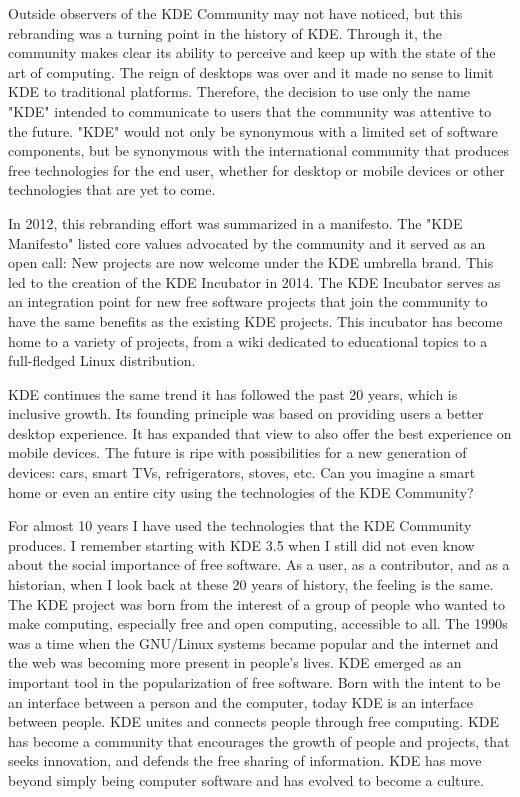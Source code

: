 Outside observers of the KDE Community may not have noticed, but this rebranding was a turning point in the history of KDE. Through it, the community makes clear its ability to perceive and keep up with the state of the art of computing. The reign of desktops was over and it made no sense to limit KDE to traditional platforms. Therefore, the decision to use only the name "KDE" intended to communicate to users that the community was attentive to the future. "KDE" would not only be synonymous with a limited set of software components, but be synonymous with the international community that produces free technologies for the end user, whether for desktop or mobile devices or other technologies that are yet to come. 

In 2012, this rebranding effort was summarized in a manifesto. The "KDE Manifesto" listed core values advocated by the community and it served as an open call: New projects are now welcome under the KDE umbrella brand. This led to the creation of the KDE Incubator in 2014. The KDE Incubator serves as an integration point for new free software projects that join the community to have the same benefits as the existing KDE projects. This incubator has become home to a variety of projects, from a wiki dedicated to educational topics to a full-fledged Linux distribution. 

KDE continues the same trend it has followed the past 20 years, which is inclusive growth. Its founding principle was based on providing users a better desktop experience. It has expanded that view to also offer the best experience on mobile devices. The future is ripe with possibilities for a new generation of devices: cars, smart TVs, refrigerators, stoves, etc. Can you imagine a smart home or even an entire city using the technologies of the KDE Community? 

For almost 10 years I have used the technologies that the KDE Community produces. I remember starting with KDE 3.5 when I still did not even know about the social importance of free software. As a user, as a contributor, and as a historian, when I look back at these 20 years of history, the feeling is the same. The KDE project was born from the interest of a group of people who wanted to make computing, especially free and open computing, accessible to all. The 1990s was a time when the GNU/Linux systems became popular and the internet and the web was becoming more present in people's lives. KDE emerged as an important tool in the popularization of free software. Born with the intent to be an interface between a person and the computer, today KDE is an interface between people. KDE unites and connects people through free computing. KDE has become a community that encourages the growth of people and projects, that seeks innovation, and defends the free sharing of information. KDE has move beyond simply being computer software and has evolved to become a culture.
